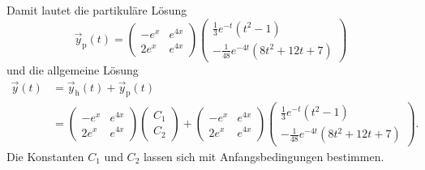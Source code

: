 \noindent
Damit lautet die partikul\"are L\"osung
$$
\vec y_{\text{p}}(t) = \begin{pmatrix}-e^x & e^{4x} \\ 2e^x & e^{4x} \end{pmatrix} \begin{pmatrix} \frac{1}{3}e^{-t}(t^2-1) \\ -\frac{1}{48} e^{-4t}(8t^2+12t+7) \end{pmatrix} 
$$
und die allgemeine L\"osung
\begin{align*}
\vec y(t) &= \vec y_{\text{h}}(t) +\vec y_{\text{p}}(t) \\
          &= \begin{pmatrix}-e^x & e^{4x} \\ 2e^x & e^{4x} \end{pmatrix} \begin{pmatrix}C_1 \\ C_2 \end{pmatrix} + \begin{pmatrix}-e^x & e^{4x} \\ 2e^x & e^{4x} \end{pmatrix} \begin{pmatrix} \frac{1}{3}e^{-t}(t^2-1) \\ -\frac{1}{48} e^{-4t}(8t^2+12t+7) \end{pmatrix}.
\end{align*}
Die Konstanten $C_1$ und $C_2$ lassen sich mit Anfangsbedingungen bestimmen.
